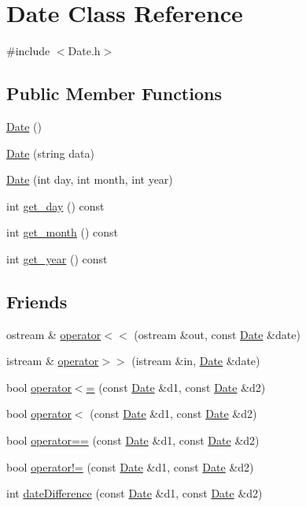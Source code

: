 \hypertarget{class_date}{}\section{Date Class Reference}
\label{class_date}


{\ttfamily \#include $<$Date.\+h$>$}

\subsection*{Public Member Functions}
\begin{DoxyCompactItemize}
\item 
\hyperlink{class_date_a4e59ed4ba66eec61c27460c5d09fa1bd}{Date} ()
\item 
\hyperlink{class_date_aed0ec4ac9e00fb6130f8a642a61180b9}{Date} (string data)
\item 
\hyperlink{class_date_ab1ad19969fa570605a6b0cd32b0da822}{Date} (int day, int month, int year)
\item 
int \hyperlink{class_date_a86208bd42da6587c4b45ed93d688d483}{get\+\_\+day} () const
\item 
int \hyperlink{class_date_a89ae60bad421600e3ee901eb0df44975}{get\+\_\+month} () const
\item 
int \hyperlink{class_date_a9e77e9f49890449fea9aeb8114da95ff}{get\+\_\+year} () const
\end{DoxyCompactItemize}
\subsection*{Friends}
\begin{DoxyCompactItemize}
\item 
ostream \& \hyperlink{class_date_a5c29d00ecf33e6d232a410f1f3d6eb70}{operator$<$$<$} (ostream \&out, const \hyperlink{class_date}{Date} \&date)
\item 
istream \& \hyperlink{class_date_a5b292605462c1f43c993c0b2f5592cdc}{operator$>$$>$} (istream \&in, \hyperlink{class_date}{Date} \&date)
\item 
bool \hyperlink{class_date_a4f314b2216e8760eac284385a7eaae12}{operator$<$=} (const \hyperlink{class_date}{Date} \&d1, const \hyperlink{class_date}{Date} \&d2)
\item 
bool \hyperlink{class_date_a5a3f411cbd59e9ecb90b2f8e6aaea551}{operator$<$} (const \hyperlink{class_date}{Date} \&d1, const \hyperlink{class_date}{Date} \&d2)
\item 
bool \hyperlink{class_date_a18dc8aca1ca4d8cadc2b464db984135b}{operator==} (const \hyperlink{class_date}{Date} \&d1, const \hyperlink{class_date}{Date} \&d2)
\item 
bool \hyperlink{class_date_a15180616122b6ffa419f17a06aca3ec7}{operator!=} (const \hyperlink{class_date}{Date} \&d1, const \hyperlink{class_date}{Date} \&d2)
\item 
int \hyperlink{class_date_a90540af47999b64ed77651ece2ed3be5}{date\+Difference} (const \hyperlink{class_date}{Date} \&d1, const \hyperlink{class_date}{Date} \&d2)
\end{DoxyCompactItemize}


